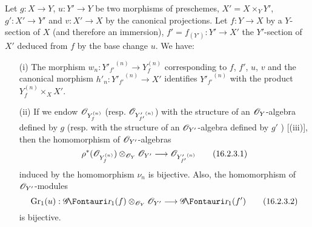 \begin{corollary}[16.2.3]
\label{IV.16.2.3}
Let $g: X \to Y$, $u: Y' \to Y$ be two morphisms of preschemes, $X' = X \times_Y Y'$, $g': X' \to Y'$ and $v: X' \to X$ by the canonical projections. Let $f: Y \to X$ by a $Y$-section of $X$ (and therefore an immersion), $f' = f_{(Y')}: Y' \to X'$ the $Y'$-section of $X'$ deduced from $f$ by the base change $u$.
We have:
\begin{enumerate}
  \item[{\rm(i)}] The morphism $w_n:{Y'_{f'}}^{(n)} \to Y_f^{(n)}$ corresponding to $f$, $f'$, $u$, $v$  and the canonical morphism $h'_n: {Y'_{f'}}^{(n)} \to X'$ identifies $ {Y'_{f'}}^{(n)}$ with the product $Y_f^{(n)} \times_X X'$.
  \item[{\rm(ii)}] If we endow $\mathscr{O}_{Y_f^{(n)}}$ (resp. $\mathscr{O}_{{Y'_{f'}}^{(n)}}$) with the structure of an $\mathscr{O}_Y$-algebra defined by $g$ (resp. with the structure of an $\mathscr{O}_{Y'}$-algebra defined by $g'$ ) [(iii)],
  then the homomorphism of $\mathscr{O}_{Y'}$-algebras
  \[
    \label{IV.16.2.3.1}
    \rho^*(\sh{O}_{Y_f^{(n)}})\otimes_{\sh{O}_Y} \sh{O}_{Y'} \to \sh{O}_{{Y'_{f'}}^{(n)}}
    \tag{16.2.3.1}
  \]
  induced by the homomorphism $\nu_n$  is bijective.
  Also, the homomorphism of $\mathscr{O}_{Y'}$-modules
  \[
    \label{IV.16.2.3.2}
    \Gr_1(u): \shGr_1(f)\otimes_{\sh{O}_Y} \sh{O}_{Y'} \to \shGr_1(f')
    \tag{16.2.3.2}
  \]
  is bijective.
 \end{enumerate} 
\end{corollary}


